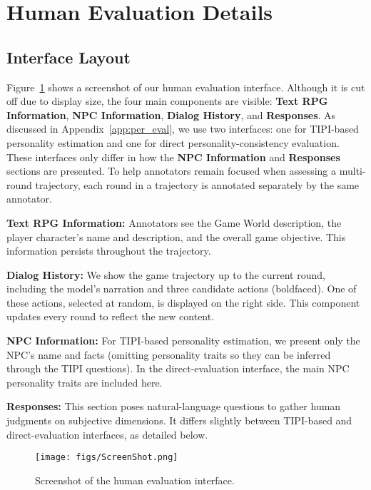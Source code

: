 \section{Human Evaluation Details}\label{app:human_eval}
\subsection{Interface Layout}
Figure~\ref{fig:human-eval} shows a screenshot of our human evaluation interface. Although it is cut off due to display size, the four main components are visible: \textbf{Text RPG Information}, \textbf{NPC Information}, \textbf{Dialog History}, and \textbf{Responses}. As discussed in Appendix~\ref{app:per_eval}, we use two interfaces: one for TIPI-based personality estimation and one for direct personality-consistency evaluation. These interfaces only differ in how the \textbf{NPC Information} and \textbf{Responses} sections are presented. To help annotators remain focused when assessing a multi-round trajectory, each round in a trajectory is annotated separately by the same annotator.

\noindent\textbf{Text RPG Information:}  
Annotators see the Game World description, the player character’s name and description, and the overall game objective. This information persists throughout the trajectory.

\noindent\textbf{Dialog History:}  
We show the game trajectory up to the current round, including the model’s narration and three candidate actions (boldfaced). One of these actions, selected at random, is displayed on the right side. This component updates every round to reflect the new content.

\noindent\textbf{NPC Information:}  
For TIPI-based personality estimation, we present only the NPC’s name and facts (omitting personality traits so they can be inferred through the TIPI questions). In the direct-evaluation interface, the main NPC personality traits are included here.

\noindent\textbf{Responses:}  
This section poses natural-language questions to gather human judgments on subjective dimensions. It differs slightly between TIPI-based and direct-evaluation interfaces, as detailed below.

\begin{figure}[!ht]
    \centering
    \texttt{[image: figs/ScreenShot.png]}
    \caption{Screenshot of the human evaluation interface.}
    \label{fig:human-eval}
\end{figure}

